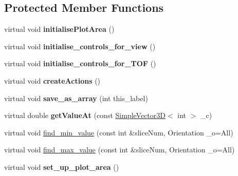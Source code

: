 \subsection*{Protected Member Functions}
\begin{DoxyCompactItemize}
\item 
\mbox{\label{classscreen__manager__ProjData_a31e255f3712b77fb7e879ce2777da9b3}} 
virtual void {\bfseries initialise\+Plot\+Area} ()
\item 
\mbox{\label{classscreen__manager__ProjData_a909deae69f4052b6d4e3829772feac96}} 
virtual void {\bfseries initialise\+\_\+controls\+\_\+for\+\_\+view} ()
\item 
\mbox{\label{classscreen__manager__ProjData_a0c8db64a77a136796003970d7cd2c424}} 
virtual void {\bfseries initialise\+\_\+controls\+\_\+for\+\_\+\+T\+OF} ()
\item 
\mbox{\label{classscreen__manager__ProjData_a538cbc6b1064a5cf6f914e140bbcf7a9}} 
virtual void {\bfseries create\+Actions} ()
\item 
\mbox{\label{classscreen__manager__ProjData_a60123dd28eaa9b631fc863c71a90cd65}} 
virtual void {\bfseries save\+\_\+as\+\_\+array} (int this\+\_\+label)
\item 
\mbox{\label{classscreen__manager__ProjData_aa2d96ab68be728e63c32e21f2eb26763}} 
virtual double {\bfseries get\+Value\+At} (const \mbox{\hyperlink{classViewer_1_1SimpleVector3D}{Simple\+Vector3D}}$<$ int $>$ \+\_\+c)
\item 
virtual void \mbox{\hyperlink{classscreen__manager__ProjData_aafc7c0ce08eb4870d885e8f4a2596e88}{find\+\_\+min\+\_\+value}} (const int \&slice\+Num, Orientation \+\_\+o=All)
\item 
virtual void \mbox{\hyperlink{classscreen__manager__ProjData_a665de828d1b1761f94a07ad63ecdf75f}{find\+\_\+max\+\_\+value}} (const int \&slice\+Num, Orientation \+\_\+o=All)
\item 
\mbox{\label{classScreen__manager_a8285b74dd2913a8368aebb8c4aeccee1}} 
virtual void {\bfseries set\+\_\+up\+\_\+plot\+\_\+area} ()

\end{DoxyCompactItemize}
